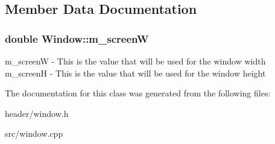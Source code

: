 \subsection{Member Data Documentation}
\hypertarget{classWindow_ac85bc93bd2e5ff41e283faa81f021a63}{
\subsubsection[{m\_\-screenW}]{\setlength{\rightskip}{0pt plus 5cm}double {\bf Window::m\_\-screenW}}}
\label{classWindow_ac85bc93bd2e5ff41e283faa81f021a63}


m\_\-screenW -\/ This is the value that will be used for the window width m\_\-screenH -\/ This is the value that will be used for the window height 

The documentation for this class was generated from the following files:\begin{DoxyCompactItemize}
\item 
header/window.h\item 
src/window.cpp\end{DoxyCompactItemize}
